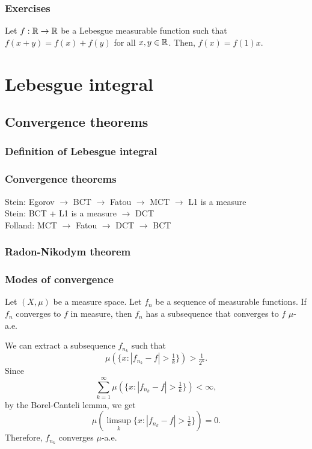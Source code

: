 \documentclass{../note}
\begin{document}
\section*{Exercises}
\begin{prb}
Let $f:\mathbb{R}\to\mathbb{R}$ be a Lebesgue measurable function such that $f(x+y)=f(x)+f(y)$ for all $x,y\in\mathbb{R}$.
Then, $f(x)=f(1)x$.
\end{prb}





\part{Lebesgue integral}


\chapter{Convergence theorems}
\section{Definition of Lebesgue integral}
\section{Convergence theorems}

Stein: Egorov $\to$ BCT $\to$ Fatou $\to$ MCT $\to$ L1 is a measure\\
Stein: BCT + L1 is a measure $\to$ DCT\\
Folland: MCT $\to$ Fatou $\to$ DCT $\to$ BCT





\section{Radon-Nikodym theorem}


\section{Modes of convergence}

\begin{prb}
Let $(X,\mu)$ be a measure space.
Let $f_n$ be a sequence of measurable functions.
If $f_n$ converges to $f$ in measure, then $f_n$ has a subsequence that converges to $f$ $\mu$-a.e.
\end{prb}
\begin{pf}
We can extract a subsequence $f_{n_k}$ such that
\[\mu(\{x:|f_{n_k}-f|>\tfrac1k\})>\tfrac1{2^k}.\]
Since
\[\sum_{k=1}^\infty\mu(\{x:|f_{n_k}-f|>\tfrac1k\})<\infty,\]
by the Borel-Canteli lemma, we get
\[\mu(\limsup_k\{x:|f_{n_k}-f|>\tfrac1k\})=0.\]
Therefore, $f_{n_k}$ converges $\mu$-a.e.
\end{pf}
\end{document}
